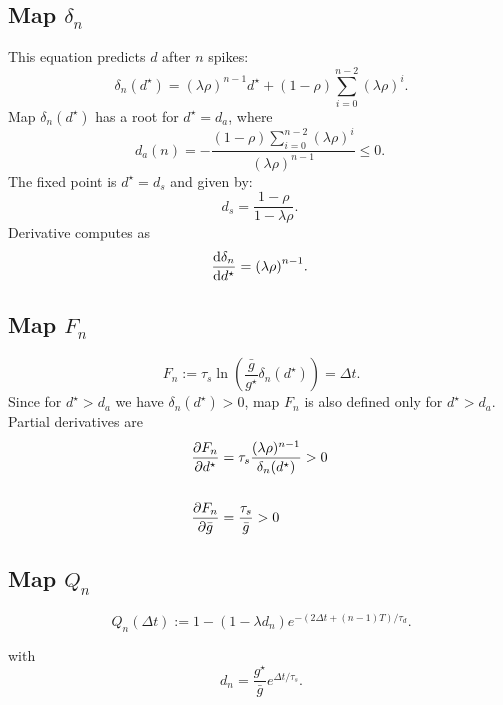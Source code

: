 \documentclass[12pt,authoryear]{elsarticle}
\newcommand{\dstar}{d^\star}
\newcommand{\gbar}{\bar g}
\newcommand{\taus}{\tau_s}
\newcommand{\dn}{\delta_n}
\newcommand{\F}{F_n}
\begin{document}
\subsection{Map $\delta_{n}$}
This equation predicts $d$ after $n$ spikes:
\begin{equation}
 ~\label{eq:delta-map}
  \delta_{n}(d^{\star}) = {(\lambda \rho)}^{n-1} d^{\star} + (1-\rho)\sum_{i=0}^{n-2}{(\lambda \rho)}^{i}.
\end{equation}
Map $\delta_{n}(\dstar)$ has a root for $\dstar=d_{a}$, where
\begin{equation}
  d_{a}(n)=-\frac{(1-\rho)\sum_{i=0}^{n-2}(\lambda \rho)^{i}}{ (\lambda \rho)^{n-1} }\leq 0.
\end{equation}
The fixed point is $\dstar=d_{s}$ and given by:
\begin{equation}
  d_{s}=\frac{1-\rho}{1-\lambda\rho}.
\end{equation}
Derivative computes as
\begin{equation}
  \dv{\dn}{\dstar} = {(\lambda\rho)}^{n-1}.
\end{equation}

\subsection{Map $F_{n}$}
\begin{equation}
 ~\label{eq:Fn-map}
  F_{n}:=\tau_{s}\ln{\left(\frac{\bar g }{g^{\star}} \delta_{n}(d^{\star})\right)}= \Delta t.
\end{equation}
Since for $\dstar>d_{a}$ we have $\delta_{n}(\dstar)>0$, map $F_{n}$ is also defined only for $\dstar>d_{a}$.
Partial derivatives are
\begin{align}
  \pdv{\F}{\dstar} &= \taus \frac{(\lambda\rho)^{n-1}}{\dn(\dstar)}>0\\
  \nonumber\\
  \pdv{\F}{\gbar}  &= \frac{\taus}{\gbar}>0
\end{align}

\subsection{Map $Q_{n}$}
\begin{equation}
 ~\label{eq:Qn-map}
  Q_{n}(\Delta t):=1- (1- \lambda d_{n})e^{-(2\Delta t+(n-1)T)/\tau_{d}}.
\end{equation}

with
\begin{equation}
 ~\label{eq:dn}
  d_{n} = \frac{g^{\star}}{\bar g} e^{\Delta t/\tau_{s}}.
\end{equation}
\end{document}
